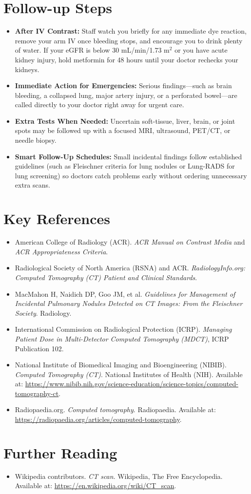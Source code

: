 \section{Follow-up Steps}
\begin{itemize}
    \item \textbf{After IV Contrast:} Staff watch you briefly for any immediate dye reaction, remove your arm IV once bleeding stops, and encourage you to drink plenty of water. If your eGFR is below 30 mL/min/1.73 m$^2$ or you have acute kidney injury, hold metformin for 48 hours until your doctor rechecks your kidneys.
    \item \textbf{Immediate Action for Emergencies:} Serious findings---such as brain bleeding, a collapsed lung, major artery injury, or a perforated bowel---are called directly to your doctor right away for urgent care.
    \item \textbf{Extra Tests When Needed:} Uncertain soft-tissue, liver, brain, or joint spots may be followed up with a focused MRI, ultrasound, PET/CT, or needle biopsy.
    \item \textbf{Smart Follow-Up Schedules:} Small incidental findings follow established guidelines (such as Fleischner criteria for lung nodules or Lung-RADS for lung screening) so doctors catch problems early without ordering unnecessary extra scans.
\end{itemize}

\section{Key References}
\begin{itemize}
    \item American College of Radiology (ACR). \textit{ACR Manual on Contrast Media} and \textit{ACR Appropriateness Criteria}.
    \item Radiological Society of North America (RSNA) and ACR. \textit{RadiologyInfo.org: Computed Tomography (CT) Patient and Clinical Standards}.
    \item MacMahon H, Naidich DP, Goo JM, et al. \textit{Guidelines for Management of Incidental Pulmonary Nodules Detected on CT Images: From the Fleischner Society}. Radiology.
    \item International Commission on Radiological Protection (ICRP). \textit{Managing Patient Dose in Multi-Detector Computed Tomography (MDCT)}, ICRP Publication 102.
    \item National Institute of Biomedical Imaging and Bioengineering (NIBIB). \textit{Computed Tomography (CT)}. National Institutes of Health (NIH). Available at: \url{https://www.nibib.nih.gov/science-education/science-topics/computed-tomography-ct}.
    \item Radiopaedia.org. \textit{Computed tomography}. Radiopaedia. Available at: \url{https://radiopaedia.org/articles/computed-tomography}.
\end{itemize}

\section{Further Reading}
\begin{itemize}
  \item Wikipedia contributors. \textit{CT scan}. Wikipedia, The Free Encyclopedia. Available at: \url{https://en.wikipedia.org/wiki/CT_scan}.
\end{itemize}
